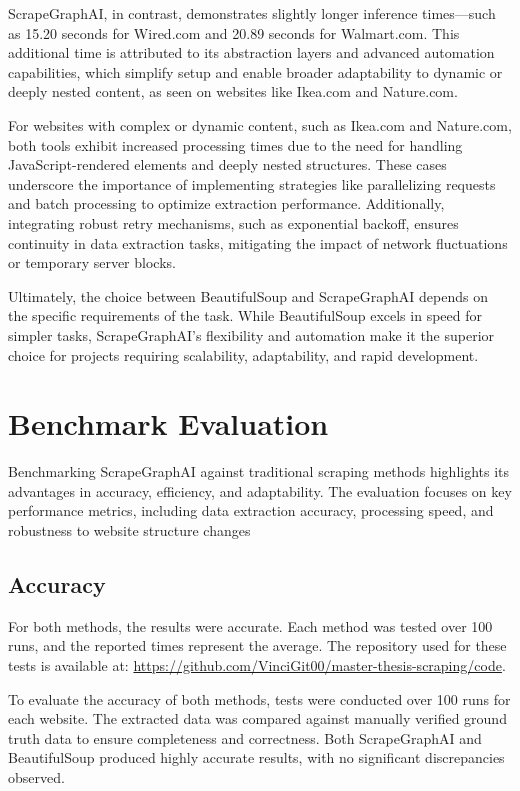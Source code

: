 ScrapeGraphAI, in contrast, demonstrates slightly longer inference times—such as 15.20 seconds for Wired.com and 20.89 seconds for Walmart.com. This additional time is attributed to its abstraction layers and advanced automation capabilities, which simplify setup and enable broader adaptability to dynamic or deeply nested content, as seen on websites like Ikea.com and Nature.com.

For websites with complex or dynamic content, such as Ikea.com and Nature.com, both tools exhibit increased processing times due to the need for handling JavaScript-rendered elements and deeply nested structures. These cases underscore the importance of implementing strategies like parallelizing requests and batch processing to optimize extraction performance. Additionally, integrating robust retry mechanisms, such as exponential backoff, ensures continuity in data extraction tasks, mitigating the impact of network fluctuations or temporary server blocks.

Ultimately, the choice between BeautifulSoup and ScrapeGraphAI depends on the specific requirements of the task. While BeautifulSoup excels in speed for simpler tasks, ScrapeGraphAI's flexibility and automation make it the superior choice for projects requiring scalability, adaptability, and rapid development.
\section{Benchmark Evaluation}
Benchmarking ScrapeGraphAI against traditional scraping methods highlights its advantages in accuracy, efficiency, and adaptability. The evaluation focuses on key performance metrics, including data extraction accuracy, processing speed, and robustness to website structure changes
\subsection{Accuracy}

For both methods, the results were accurate. Each method was tested over 100 runs, and the reported times represent the average. The repository used for these tests is available at: \url{https://github.com/VinciGit00/master-thesis-scraping/code}.

To evaluate the accuracy of both methods, tests were conducted over 100 runs for each website. The extracted data was compared against manually verified ground truth data to ensure completeness and correctness. Both ScrapeGraphAI and BeautifulSoup produced highly accurate results, with no significant discrepancies observed.

